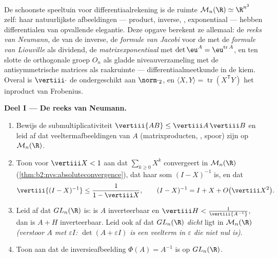 \begin{problem}\label{pb:b2:diffcalc:1}
De schoonste speeltuin voor differentiaalrekening is de ruimte
$\mathcal M_n(\R) \simeq \R^{n^2}$ zelf: haar natuurlijkste
afbeeldingen --- product, inverse, , exponentiaal ---
hebben differentialen van opvallende elegantie. Deze opgave
berekent ze allemaal: de \emph{reeks van Neumann}, de
 van de inverse, de \emph{formule van
Jacobi} voor de  met de
\emph{formule van Liouville} als dividend, de
\emph{matrixexponentiaal} met $\det\eu^A
= \eu^{\operatorname{tr}A}$, en ten slotte de orthogonale groep
$O_n$ als gladde niveauverzameling met de antisymmetrische
matrices als raakruimte --- differentiaalmeetkunde in de kiem.
Overal is $\vertiii\cdot$ de  ondergeschikt aan
$\norm\cdot_2$, en $\langle X, Y\rangle =
\operatorname{tr}(X^{\mathsf T}Y)$ het inproduct van Frobenius.

\medskip
\noindent\textbf{Deel I --- De reeks van Neumann.}
\begin{enumerate}
  \item Bewijs de submultiplicativiteit $\vertiii{AB} \leq
        \vertiii A\,\vertiii B$ en leid af dat
        veeltermafbeeldingen van $A$ (matrixproducten,
        , spoor)  zijn op $\mathcal M_n(\R)$.
  \item Toon voor $\vertiii X < 1$ aan dat $\sum_{k\geq0}X^k$
         convergeert in $\mathcal M_n(\R)$
        (\cref{thm:b2:nvs:absoluteconvergence}), dat haar som $(I
        - X)^{-1}$ is, en dat
        \[
        \vertiii{(I - X)^{-1}} \leq \frac{1}{1 - \vertiii X},
        \qquad
        (I - X)^{-1} = I + X + O\bigl(\vertiii X^2\bigr) .
        \]
  \item Leid af dat $GL_n(\R)$ \emph{} is: is $A$
        inverteerbaar en $\vertiii H < \frac{1}{\vertiii{A^{-1}}}$,
        dan is $A + H$ inverteerbaar. Leid ook af dat $GL_n(\R)$
        \emph{dicht} ligt in $\mathcal M_n(\R)$ \emph{(verstoor $A$
        met $\varepsilon I$: $\det(A + \varepsilon I)$ is een
        veelterm in $\varepsilon$ die niet nul is)}.
  \item Toon aan dat de inversieafbeelding $\Phi(A) = A^{-1}$
         is op $GL_n(\R)$.
\end{enumerate}


\end{problem}
